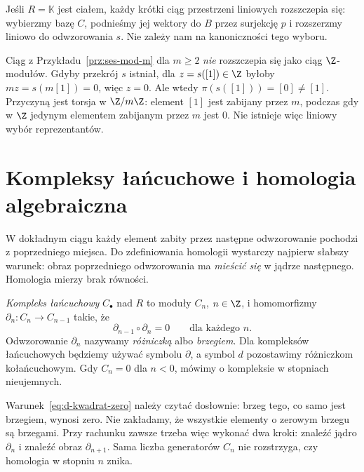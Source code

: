 \begin{uwaga}
Jeśli $R=\mathbb K$ jest ciałem, każdy krótki
ciąg przestrzeni liniowych rozszczepia się:
wybierzmy bazę $C$, podnieśmy jej wektory
do $B$ przez surjekcję $p$ i rozszerzmy
liniowo do odwzorowania $s$. Nie zależy nam na
kanoniczności tego wyboru.

Ciąg z Przykładu~\ref{prz:ses-mod-m} dla
$m\geq2$ \emph{nie} rozszczepia się jako
ciąg $\Z$-modułów. Gdyby przekrój $s$
istniał, dla $z=s([1])\in\Z$ byłoby
$mz=s(m[1])=0$, więc $z=0$.
Ale wtedy $\pi(s([1]))=[0]\ne[1]$.
Przyczyną jest torsja w $\Z/m\Z$: element $[1]$
jest zabijany przez $m$, podczas gdy w $\Z$
jedynym elementem zabijanym przez $m$ jest $0$.
Nie istnieje więc liniowy wybór reprezentantów.
\end{uwaga}
\section{Kompleksy łańcuchowe i homologia algebraiczna}
\label{sec:kompleks-homologia}

W dokładnym ciągu każdy element zabity przez
następne odwzorowanie pochodzi z poprzedniego miejsca.
Do zdefiniowania homologii wystarczy najpierw
słabszy warunek: obraz poprzedniego odwzorowania ma
\emph{mieścić się} w jądrze następnego.
Homologia mierzy brak równości.

\begin{definicja}
\label{def:kompleks-lancuchowy}
\emph{Kompleks łańcuchowy} $C_\bullet$ nad $R$
to moduły $C_n$, $n\in\Z$, i homomorfizmy
$\partial_n:C_n\to C_{n-1}$ takie, że
\begin{equation}\label{eq:d-kwadrat-zero}
 \partial_{n-1}\circ \partial_n=0\qquad\text{dla każdego }n.
\end{equation}
Odwzorowanie $\partial_n$ nazywamy \emph{różniczką} albo
\emph{brzegiem}. Dla kompleksów łańcuchowych
będziemy używać symbolu $\partial$, a symbol $d$
pozostawimy różniczkom kołańcuchowym.
Gdy $C_n=0$ dla $n<0$,
mówimy o kompleksie w stopniach nieujemnych.
\end{definicja}

Warunek~\eqref{eq:d-kwadrat-zero} należy czytać
dosłownie: brzeg tego, co samo jest brzegiem,
wynosi zero. Nie zakładamy, że wszystkie
elementy o zerowym brzegu są brzegami.
Przy rachunku zawsze trzeba więc wykonać dwa kroki:
znaleźć jądro $\partial_n$ i znaleźć obraz
$\partial_{n+1}$. Sama liczba generatorów $C_n$
nie rozstrzyga, czy homologia w stopniu $n$ znika.

